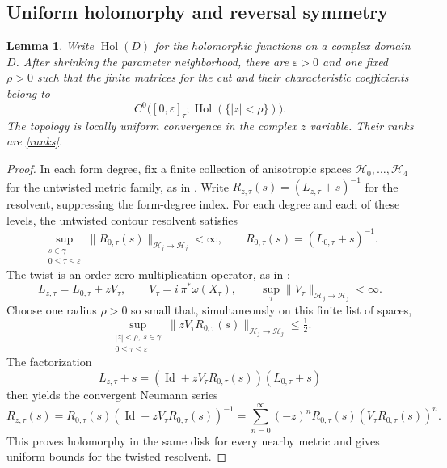 \documentclass[11pt,letterpaper,reqno]{amsart}
\newtheorem{lemma}[theorem]{Lemma}
\theoremstyle{remark}
\newcommand{\Id}{\operatorname{Id}}
\newcommand{\Hol}{\operatorname{Hol}}
\begin{document}
\subsection{Uniform holomorphy and reversal symmetry}\label{sec:holom}
\begin{lemma}\label{holom}
Write $\Hol(D)$ for the holomorphic functions on a complex domain
$D$. After shrinking the parameter neighborhood, there are
$\varepsilon>0$ and one fixed $\rho>0$ such that the finite matrices
for the cut and their characteristic coefficients belong to
\[
 C^0\bigl([0,\varepsilon]_\tau;
             \Hol(\{|z|<\rho\})\bigr).
\]
The topology is locally uniform convergence
in the complex $z$ variable. Their ranks are \eqref{ranks}.
\end{lemma}
\begin{proof}
In each form degree, fix a finite collection of anisotropic spaces
\(\mathcal H_0,\ldots,\mathcal H_4\) for the untwisted metric family,
as in \cite[Appendix B.4--B.6]{CD}. Write
$R_{z,\tau}(s)=(L_{z,\tau}+s)^{-1}$ for the resolvent, suppressing
the form-degree index. For each degree and each of these levels, the
untwisted contour resolvent satisfies
\begin{equation}\label{xp:resolvent-bounds}
 \sup_{\substack{s\in\gamma\\0\leq\tau\leq\varepsilon}}
 \|R_{0,\tau}(s)\|_{\mathcal H_j\to\mathcal H_j}<\infty,
 \qquad
 R_{0,\tau}(s)=(L_{0,\tau}+s)^{-1}.
\end{equation}
The twist is an order-zero multiplication operator, as in
\cite[(8.9)]{CD}:
\begin{equation}\label{xp:twist-multiplier}
 L_{z,\tau}=L_{0,\tau}+zV_\tau,
 \qquad V_\tau=i\,\pi^*\omega(X_\tau),
 \qquad
 \sup_{\tau}\|V_\tau\|_{\mathcal H_j\to\mathcal H_j}<\infty.
\end{equation}
Choose one radius \(\rho>0\) so small that, simultaneously on this
finite list of spaces,
\begin{equation}\label{xp:uniform-neumann-smallness}
 \sup_{\substack{|z|<\rho,\ s\in\gamma\\0\leq\tau\leq\varepsilon}}
 \|zV_\tau R_{0,\tau}(s)\|_{\mathcal H_j\to\mathcal H_j}
 \leq\tfrac12.
\end{equation}
The factorization
\[
 L_{z,\tau}+s
   =(\Id+zV_\tau R_{0,\tau}(s))(L_{0,\tau}+s)
\]
then yields the convergent Neumann series
\begin{equation}\label{Neumann}
 R_{z,\tau}(s)
 =R_{0,\tau}(s)(\Id+zV_\tau R_{0,\tau}(s))^{-1}
 =\sum_{n=0}^{\infty}(-z)^n
       R_{0,\tau}(s)(V_\tau R_{0,\tau}(s))^n.
\end{equation}
This proves holomorphy in the same disk for every nearby metric and
gives uniform bounds for the twisted resolvent.


\end{proof}
\end{document}
